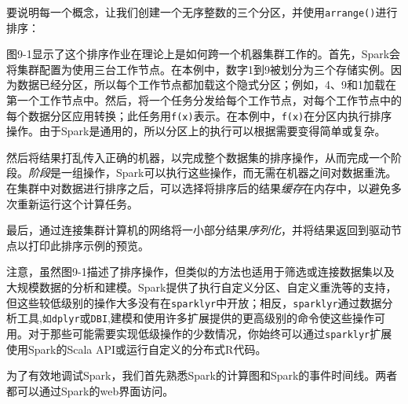 \documentclass[
]{article}
\newenvironment{Shaded}{\begin{snugshade}}{\end{snugshade}}
\newcommand{\DataTypeTok}[1]{\textcolor[rgb]{0.13,0.29,0.53}{#1}}
\newcommand{\DecValTok}[1]{\textcolor[rgb]{0.00,0.00,0.81}{#1}}
\newcommand{\KeywordTok}[1]{\textcolor[rgb]{0.13,0.29,0.53}{\textbf{#1}}}
\newcommand{\NormalTok}[1]{#1}
\newcommand{\OperatorTok}[1]{\textcolor[rgb]{0.81,0.36,0.00}{\textbf{#1}}}
\newcommand{\StringTok}[1]{\textcolor[rgb]{0.31,0.60,0.02}{#1}}
\begin{document}
要说明每一个概念，让我们创建一个无序整数的三个分区，并使用\texttt{arrange()}进行排序：

\begin{Shaded}
\end{Shaded}

图9-1显示了这个排序作业在理论上是如何跨一个机器集群工作的。首先，Spark会将集群配置为使用三台工作节点。在本例中，数字1到9被划分为三个存储实例。因为数据已经分区，所以每个工作节点都加载这个隐式分区；例如，4、9和1加载在第一个工作节点中。然后，将一个任务分发给每个工作节点，对每个工作节点中的每个数据分区应用转换；此任务用\texttt{f(x)}表示。在本例中，\texttt{f(x)}在分区内执行排序操作。由于Spark是通用的，所以分区上的执行可以根据需要变得简单或复杂。

然后将结果打乱传入正确的机器，以完成整个数据集的排序操作，从而完成一个阶段。\emph{阶段}是一组操作，Spark可以执行这些操作，而无需在机器之间对数据重洗。在集群中对数据进行排序之后，可以选择将排序后的结果\emph{缓存}在内存中，以避免多次重新运行这个计算任务。

最后，通过连接集群计算机的网络将一小部分结果\emph{序列化}，并将结果返回到驱动节点以打印此排序示例的预览。

注意，虽然图9-1描述了排序操作，但类似的方法也适用于筛选或连接数据集以及大规模数据的分析和建模。Spark提供了执行自定义分区、自定义重洗等的支持，但这些较低级别的操作大多没有在\texttt{sparklyr}中开放；相反，\texttt{sparklyr}通过数据分析工具,\texttt{如dplyr}或\texttt{DBI},建模和使用许多扩展提供的更高级别的命令使这些操作可用。对于那些可能需要实现低级操作的少数情况，你始终可以通过\texttt{sparklyr}扩展使用Spark的Scala
API或运行自定义的分布式R代码。

为了有效地调试Spark，我们首先熟悉Spark的计算图和Spark的事件时间线。两者都可以通过Spark的web界面访问。
\end{document}
